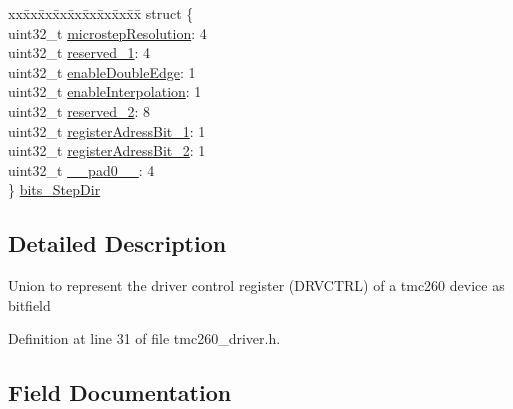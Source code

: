 \begin{DoxyCompactItemize}
\begin{tabbing}
\end{tabbing}\item 
\begin{tabbing}
xx\=xx\=xx\=xx\=xx\=xx\=xx\=xx\=xx\=\kill
struct \{\\
\>uint32\_t \mbox{\hyperlink{uniontmc260___driver_control_register___a12c9868d844405ab4e10a01eb6ab233d}{microstepResolution}}: 4\\
\>uint32\_t \mbox{\hyperlink{uniontmc260___driver_control_register___aa5d9ea4624bf97017a821a70177c6bdb}{reserved\_1}}: 4\\
\>uint32\_t \mbox{\hyperlink{uniontmc260___driver_control_register___a8024f71382e63d9e811a44b4b5d22bbb}{enableDoubleEdge}}: 1\\
\>uint32\_t \mbox{\hyperlink{uniontmc260___driver_control_register___af49e67e1f56556af4176e1c0f925a1c2}{enableInterpolation}}: 1\\
\>uint32\_t \mbox{\hyperlink{uniontmc260___driver_control_register___a50b223df92282d04dfa46306b53a9905}{reserved\_2}}: 8\\
\>uint32\_t \mbox{\hyperlink{uniontmc260___driver_control_register___a8e58d0701295971bc3d890f5107f8aa5}{registerAdressBit\_1}}: 1\\
\>uint32\_t \mbox{\hyperlink{uniontmc260___driver_control_register___abd6d1c957737511340b85f5c2d61f9ab}{registerAdressBit\_2}}: 1\\
\>uint32\_t \mbox{\hyperlink{uniontmc260___driver_control_register___a3e57c2ef1c3ffb36722f000cc1156824}{\_\_pad0\_\_}}: 4\\
\} \mbox{\hyperlink{uniontmc260___driver_control_register___ab82450c023917665e27a783ffd4f1627}{bits\_StepDir}}\\

\end{tabbing}\end{DoxyCompactItemize}


\subsection{Detailed Description}
Union to represent the driver control register (D\+R\+V\+C\+T\+RL) of a tmc260 device as bitfield 

Definition at line 31 of file tmc260\+\_\+driver.\+h.



\subsection{Field Documentation}
\mbox{\label{uniontmc260___driver_control_register___a3e57c2ef1c3ffb36722f000cc1156824}} 
